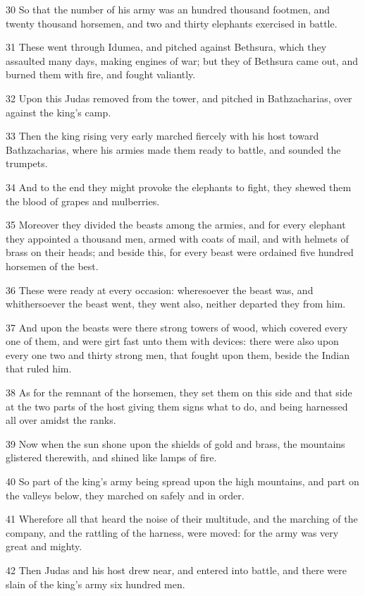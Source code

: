 \par 30 So that the number of his army was an hundred thousand footmen, and twenty thousand horsemen, and two and thirty elephants exercised in battle.
\par 31 These went through Idumea, and pitched against Bethsura, which they assaulted many days, making engines of war; but they of Bethsura came out, and burned them with fire, and fought valiantly.
\par 32 Upon this Judas removed from the tower, and pitched in Bathzacharias, over against the king's camp.
\par 33 Then the king rising very early marched fiercely with his host toward Bathzacharias, where his armies made them ready to battle, and sounded the trumpets.
\par 34 And to the end they might provoke the elephants to fight, they shewed them the blood of grapes and mulberries.
\par 35 Moreover they divided the beasts among the armies, and for every elephant they appointed a thousand men, armed with coats of mail, and with helmets of brass on their heads; and beside this, for every beast were ordained five hundred horsemen of the best.
\par 36 These were ready at every occasion: wheresoever the beast was, and whithersoever the beast went, they went also, neither departed they from him.
\par 37 And upon the beasts were there strong towers of wood, which covered every one of them, and were girt fast unto them with devices: there were also upon every one two and thirty strong men, that fought upon them, beside the Indian that ruled him.
\par 38 As for the remnant of the horsemen, they set them on this side and that side at the two parts of the host giving them signs what to do, and being harnessed all over amidst the ranks.
\par 39 Now when the sun shone upon the shields of gold and brass, the mountains glistered therewith, and shined like lamps of fire.
\par 40 So part of the king's army being spread upon the high mountains, and part on the valleys below, they marched on safely and in order.
\par 41 Wherefore all that heard the noise of their multitude, and the marching of the company, and the rattling of the harness, were moved: for the army was very great and mighty.
\par 42 Then Judas and his host drew near, and entered into battle, and there were slain of the king's army six hundred men.
